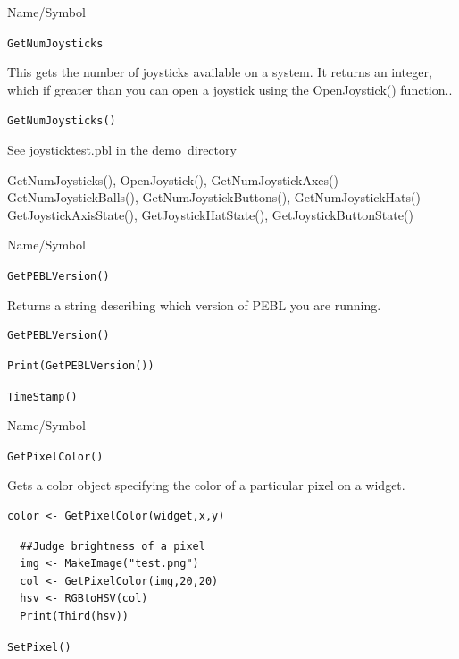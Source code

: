 \begin{desc}{Name/Symbol}
\item[Name/Symbol] \verb+GetNumJoysticks+ 

\item[Description]  
  This gets the number of joysticks available on a system. It returns an integer, which if greater than
  you can open a joystick using the OpenJoystick() function.. 
\item[Usage]          \verb+GetNumJoysticks()+ 

\item[Example]
See joysticktest.pbl in the demo\ directory

\item[See Also]
GetNumJoysticks(), OpenJoystick(), GetNumJoystickAxes()
GetNumJoystickBalls(), GetNumJoystickButtons(), GetNumJoystickHats()
GetJoystickAxisState(), GetJoystickHatState(), GetJoystickButtonState()
\end{desc} 



\begin{desc}{Name/Symbol}
\item[Name/Symbol]	\verb+GetPEBLVersion()+

\item[Description]	Returns a string describing which version of PEBL you are running.

\item[Usage]
\begin{verbatim}
GetPEBLVersion() 
\end{verbatim}

\item[Example]
\begin{verbatim}
Print(GetPEBLVersion())
\end{verbatim}

\item[See Also]	\verb+TimeStamp()+
\end{desc}


\begin{desc}{Name/Symbol}
\item[Name/Symbol]	\verb+GetPixelColor()+

\item[Description] Gets a color object specifying the color of a particular pixel on a widget.

\item[Usage]
\begin{verbatim}
color <- GetPixelColor(widget,x,y) 
\end{verbatim}

\item[Example]
\begin{verbatim}
  ##Judge brightness of a pixel
  img <- MakeImage("test.png")
  col <- GetPixelColor(img,20,20)
  hsv <- RGBtoHSV(col)
  Print(Third(hsv))

\end{verbatim}

\item[See Also]	\verb+SetPixel()+
\end{desc}


